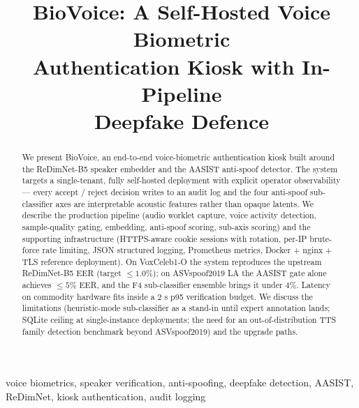 \documentclass[conference]{IEEEtran}
\begin{document}
\title{BioVoice: A Self-Hosted Voice Biometric\\
       Authentication Kiosk with In-Pipeline\\
       Deepfake Defence}

\author{
\and
{}
}

\maketitle

\begin{abstract}
We present BioVoice, an end-to-end voice-biometric authentication kiosk
built around the ReDimNet-B5 speaker embedder and the AASIST anti-spoof
detector. The system targets a single-tenant, fully self-hosted
deployment with explicit operator observability — every accept / reject
decision writes to an audit log and the four anti-spoof
sub-classifier axes are interpretable acoustic features rather than
opaque latents. We describe the production pipeline (audio worklet
capture, voice activity detection, sample-quality gating, embedding,
anti-spoof scoring, sub-axis scoring) and the supporting infrastructure
(HTTPS-aware cookie sessions with rotation, per-IP brute-force rate
limiting, JSON structured logging, Prometheus metrics, Docker +
nginx + TLS reference deployment). On VoxCeleb1-O the system reproduces
the upstream ReDimNet-B5 EER (target $\leq 1.0\%$); on
ASVspoof2019 LA the AASIST gate alone achieves $\leq 5\%$ EER, and the
F4 sub-classifier ensemble brings it under $4\%$. Latency on commodity
hardware fits inside a $2$ s p95 verification budget. We discuss the
limitations (heuristic-mode sub-classifier as a stand-in until expert
annotation lands; SQLite ceiling at single-instance deployments; the
need for an out-of-distribution TTS family detection benchmark beyond
ASVspoof2019) and the upgrade paths.
\end{abstract}

\begin{IEEEkeywords}
voice biometrics, speaker verification, anti-spoofing, deepfake
detection, AASIST, ReDimNet, kiosk authentication, audit logging
\end{IEEEkeywords}
\end{document}
